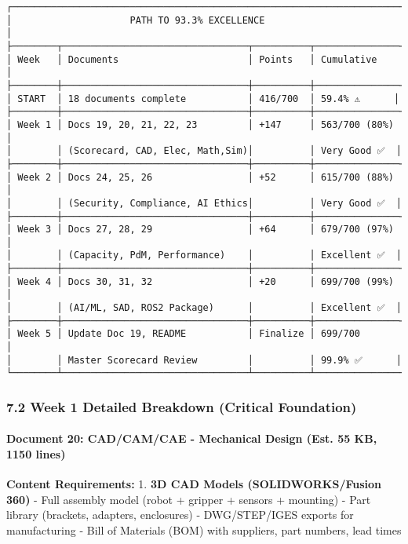 \documentclass[
]{article}
\begin{document}
\begin{verbatim}
┌──────────────────────────────────────────────────────────────────────┐
│                     PATH TO 93.3% EXCELLENCE                         │
├────────┬─────────────────────────────────┬──────────┬───────────────┤
│ Week   │ Documents                       │ Points   │ Cumulative    │
├────────┼─────────────────────────────────┼──────────┼───────────────┤
│ START  │ 18 documents complete           │ 416/700  │ 59.4% ⚠️      │
├────────┼─────────────────────────────────┼──────────┼───────────────┤
│ Week 1 │ Docs 19, 20, 21, 22, 23         │ +147     │ 563/700 (80%) │
│        │ (Scorecard, CAD, Elec, Math,Sim)│          │ Very Good ✅  │
├────────┼─────────────────────────────────┼──────────┼───────────────┤
│ Week 2 │ Docs 24, 25, 26                 │ +52      │ 615/700 (88%) │
│        │ (Security, Compliance, AI Ethics│          │ Very Good ✅  │
├────────┼─────────────────────────────────┼──────────┼───────────────┤
│ Week 3 │ Docs 27, 28, 29                 │ +64      │ 679/700 (97%) │
│        │ (Capacity, PdM, Performance)    │          │ Excellent ✅  │
├────────┼─────────────────────────────────┼──────────┼───────────────┤
│ Week 4 │ Docs 30, 31, 32                 │ +20      │ 699/700 (99%) │
│        │ (AI/ML, SAD, ROS2 Package)      │          │ Excellent ✅  │
├────────┼─────────────────────────────────┼──────────┼───────────────┤
│ Week 5 │ Update Doc 19, README           │ Finalize │ 699/700       │
│        │ Master Scorecard Review         │          │ 99.9% ✅      │
└────────┴─────────────────────────────────┴──────────┴───────────────┘
\end{verbatim}

\hypertarget{week-1-detailed-breakdown-critical-foundation}{%
\subsubsection{7.2 Week 1 Detailed Breakdown (Critical
Foundation)}\label{week-1-detailed-breakdown-critical-foundation}}

\hypertarget{document-20-cadcamcae---mechanical-design-est.-55-kb-1150-lines}{%
\paragraph{Document 20: CAD/CAM/CAE - Mechanical Design (Est. 55 KB,
1150
lines)}\label{document-20-cadcamcae---mechanical-design-est.-55-kb-1150-lines}}

\textbf{Content Requirements:} 1. \textbf{3D CAD Models
(SOLIDWORKS/Fusion 360)} - Full assembly model (robot + gripper +
sensors + mounting) - Part library (brackets, adapters, enclosures) -
DWG/STEP/IGES exports for manufacturing - Bill of Materials (BOM) with
suppliers, part numbers, lead times
\end{document}
